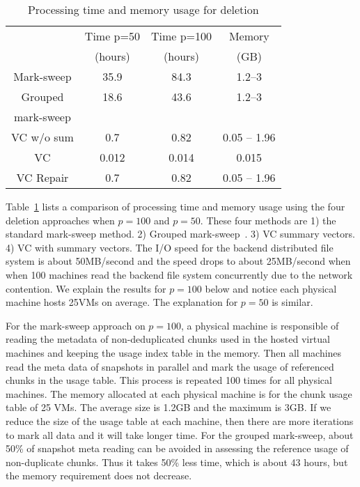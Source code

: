 

\begin{table}[htb]
\centering
\begin{small}
\begin{tabular}{|c|c|c|c|}
    \hline 
	    &Time p=50 & Time p=100 & Memory \\
	    &(hours)  & (hours) & (GB) \\
\hline
Mark-sweep  & 35.9  &  84.3  & 1.2--3 \\
\hline
Grouped &     18.6    & 43.6   & 1.2--3 \\
mark-sweep &        &    &  \\
\hline
VC w/o sum &  0.7     & 0.82   & 0.05 -- 1.96 \\
\hline
VC  &  0.012      & 0.014   & 0.015  \\
\hline
VC Repair  &  0.7      & 0.82   & 0.05 -- 1.96 \\
\hline
    \end{tabular}
\end{small}
    \caption{ Processing time and memory usage  for
deletion}  
    \label{tab:deletion-cmp}
\end{table}

Table~\ref{tab:deletion-cmp}   lists a comparison of processing time and memory usage
using the four deletion approaches when $p=100$ and $p=50$. These four 
methods are 1) the standard mark-sweep method. 2) Grouped mark-sweep~\cite{Guo2011}. 
3)   VC summary vectors. 4) VC with summary vectors.
The I/O speed for the backend distributed file system is about 50MB/second
and the speed drops to about 25MB/second when
when 100 machines read the backend file system concurrently due to the network
contention. We explain the results for $p=100$ below and notice each physical machine hosts 25VMs on average. The explanation for $p=50$ is similar.

For the mark-sweep approach on $p=100$, a physical machine is responsible of 
reading the metadata of non-deduplicated chunks used in the hosted 
virtual machines and keeping the usage index table in the memory.
Then all machines read the meta data 
of snapshots in parallel and mark the usage of referenced chunks
in the usage table.
This process is repeated 100 times for all physical machines.
The memory allocated at each physical machine is for the 
chunk usage table of 25 VMs. The average size is 1.2GB and the maximum is
3GB. If we reduce the size of  the usage table at each machine, 
then there are more iterations to mark all data and it 
will take longer time.    
For the grouped mark-sweep, about 50\% of snapshot meta reading can be 
avoided in assessing the reference usage of non-duplicate chunks. 
Thus it takes 50\% less time, which is about 43 hours, but the 
memory requirement does not decrease.

